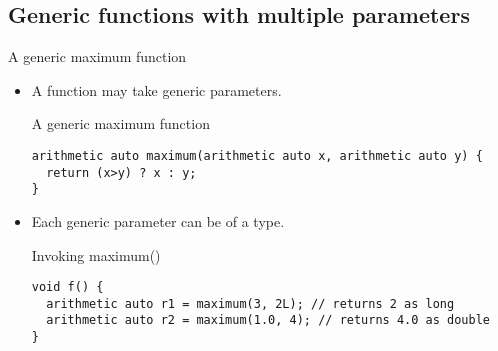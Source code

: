 \subsection{Generic functions with multiple parameters}

\begin{frame}[t,fragile]{A generic maximum function}
\begin{itemize}
  \item A function may take  generic parameters.

\begin{block}{A generic maximum function}
\begin{lstlisting}
arithmetic auto maximum(arithmetic auto x, arithmetic auto y) {
  return (x>y) ? x : y;
}
\end{lstlisting}
\end{block}

  \item Each generic parameter can be of a  type.

\begin{block}{Invoking maximum()}
\begin{lstlisting}
void f() {
  arithmetic auto r1 = maximum(3, 2L); // returns 2 as long
  arithmetic auto r2 = maximum(1.0, 4); // returns 4.0 as double
}
\end{lstlisting}
\end{block}

\end{itemize}
\end{frame}


